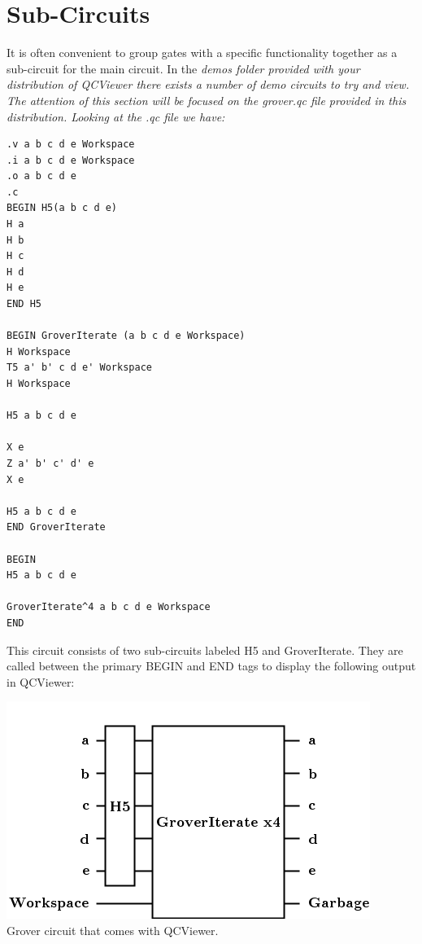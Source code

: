 \documentclass[10pt]{article}
\theoremstyle{definition}
\begin{document}
\section{Sub-Circuits}\label{sec:SubCircuits}

It is often convenient to group gates with a specific functionality together as a sub-circuit for the main circuit. In the \em demos \em folder provided with your distribution of QCViewer there exists a number of demo circuits to try and view. The attention of this section will be focused on the \em grover.qc \em file provided in this distribution. Looking at the .qc file we have:

\small
\begin{verbatim}
.v a b c d e Workspace
.i a b c d e Workspace
.o a b c d e
.c
BEGIN H5(a b c d e)
H a
H b
H c
H d
H e
END H5

BEGIN GroverIterate (a b c d e Workspace)
H Workspace
T5 a' b' c d e' Workspace
H Workspace

H5 a b c d e

X e
Z a' b' c' d' e
X e

H5 a b c d e
END GroverIterate

BEGIN
H5 a b c d e

GroverIterate^4 a b c d e Workspace 
END

\end{verbatim}
\normalsize

This circuit consists of two sub-circuits labeled H5 and GroverIterate. They are called between the primary BEGIN and END tags to display the following output in QCViewer:

\begin{center}
\includegraphics[scale=.7]{Figures/SubCircuits/GroverCircuit} \\
Grover circuit that comes with QCViewer.
\end{center}
\end{document}
